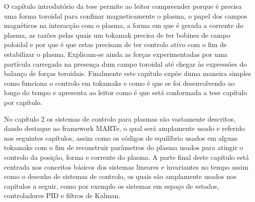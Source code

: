 O capítulo introdutório da tese permite ao leitor compreender porque é precisa uma forma toroidal para confinar magneticamente o plasma, o papel dos campos magnéticos na interacção com o plasma, a forma em que é gerada a corrente do plasma, as razões pelas quais um tokamak precisa de ter bobines de campo poloidal e por que é que estas precisam de ter controlo ativo com o fim de estabilizar o plasma. Explicam-se ainda as forças experimentadas por uma partícula carregada na presença dum campo toroidal até chegar às expressões do balanço de forças toroidais. Finalmente este capítulo expõe  duma maneira simples como funciona o controlo em tokamaks e como é que se foi desenvolvendo ao longo do tempo e apresenta ao leitor como é que está conformada a tese capítulo por capítulo. \smallskip

No capítulo 2  os sistemas de controlo para plasmas são vastamente descritos, dando destaque ao framework MARTe, o qual será amplamente usado e referido nos seguintes capítulos,  assim como  os códigos de equilíbrio usados em alguns tokamaks com o fim de reconstruir parâmetros do plasma usados para atingir o controlo da posição, forma e corrente do plasma. A parte final deste capítulo está centrada  nos conceitos básicos dos sistemas lineares e invariantes no tempo assim como o desenho de sistemas de controlo, os quais são amplamente usados nos capítulos a seguir, como por exemplo os sistemas em espaço de estados, controladores PID e filtros de Kalman. \smallskip

